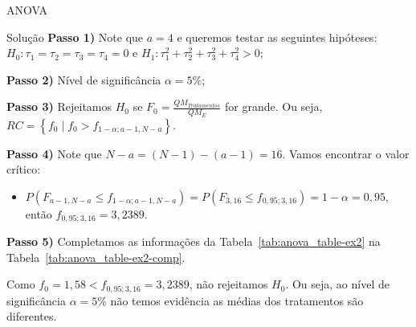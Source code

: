 \documentclass[8pt]{beamer}
\begin{document}
\begin{frame}{ANOVA}

\normalsize
\begin{block}{Solução}
	\textbf{Passo 1)} Note que $a = 4$ e queremos testar as seguintes hipóteses: $H_0: \tau_1 = \tau_2 = \tau_3 = \tau_4 = 0$ e $H_1: \tau_1^2 + \tau_2^2 + \tau_3^2 + \tau_4^2 > 0$;
	
	\textbf{Passo 2)} Nível de significância $\alpha=5\%$;
	
	\textbf{Passo 3)} Rejeitamos $H_0$ se $F_0 = \frac{QM_{Tratamentos}}{QM_E}$ for grande. Ou seja, $RC = \left\{ f_0 \mid f_0 > f_{1-\alpha;a-1,N-a} \right\}$.
	
	\textbf{Passo 4)} Note que $N-a = (N-1)  - (a-1) = 16$. Vamos encontrar o valor crítico:
	\begin{itemize}
		\item $P(F_{a-1, N-a} \leq f_{1-\alpha; a-1, N-a}) = P(F_{3, 16} \leq f_{0,95; 3, 16}) = 1- \alpha = 0,95$, então $f_{0,95; 3, 16} = 3,2389$.
	\end{itemize}

	\textbf{Passo 5)} Completamos as informações da Tabela~\ref{tab:anova_table-ex2} na Tabela~\ref{tab:anova_table-ex2-comp}.
	\begin{table}[htbp]
		\centering
		\caption{Algumas informações do experimento.}
		\label{tab:anova_table-ex2-comp}
	\end{table}
	Como $f_0 = 1,58 < f_{0,95; 3, 16} = 3,2389$, não rejeitamos $H_0$. Ou seja, ao nível de significância $\alpha=5\%$ não temos evidência as médias dos tratamentos são diferentes.
\end{block}
\normalsize
\end{frame}
\end{document}
